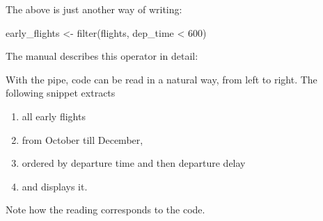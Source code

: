 \documentclass[]{book}
\newenvironment{Shaded}{}{}
\newcommand{\DecValTok}[1]{#1}
\newcommand{\KeywordTok}[1]{\textcolor[rgb]{0.00,0.00,1.00}{#1}}
\newcommand{\NormalTok}[1]{#1}
\newcommand{\OperatorTok}[1]{#1}
\newcommand{\StringTok}[1]{\textcolor[rgb]{0.00,0.50,0.50}{#1}}
\providecommand{\tightlist}{%
  \setlength{\itemsep}{0pt}\setlength{\parskip}{0pt}}
\begin{document}
\begin{Shaded}
\end{Shaded}

The above is just another way of writing:

\begin{Shaded}
\begin{Highlighting}[]
\NormalTok{early_flights <-}\StringTok{ }\KeywordTok{filter}\NormalTok{(flights, dep_time }\OperatorTok{<}\StringTok{ }\DecValTok{600}\NormalTok{)}
\end{Highlighting}
\end{Shaded}

The manual describes this operator in detail:

\begin{Shaded}
\end{Shaded}

With the pipe, code can be read in a natural way, from left to right.
The following snippet extracts

\begin{enumerate}
\def\labelenumi{\arabic{enumi}.}
\tightlist
\item
  all early flights
\item
  from October till December,
\item
  ordered by departure time and then departure delay
\item
  and displays it.
\end{enumerate}

Note how the reading corresponds to the code.

\begin{Shaded}
\end{Shaded}
\end{document}

